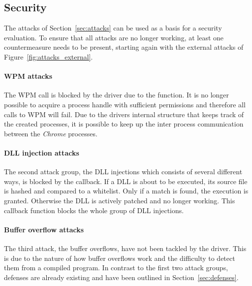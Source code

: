 \subsection{Security}
\label{sec:security}
The attacks of Section~\ref{sec:attacks} can be used as a basis for a security evaluation. To ensure that all attacks are no longer working, at least one countermeasure needs to be present, starting again with the external attacks of Figure~\ref{fig:attacks_external}. 

\paragraph{\gls{WPM} attacks}
The \gls{WPM} call is blocked by the driver due to the  function. It is no longer possible to acquire a process handle with sufficient permissions and therefore all calls to \gls{WPM} will fail. Due to the drivers internal structure that keeps track of the created processes, it is possible to keep up the inter process communication between the \emph{Chrome} processes. 

\paragraph{\gls{DLL} injection attacks}
The second attack group, the \gls{DLL} injections which consists of several different ways, is blocked by the  callback. If a \gls{DLL} is about to be executed, its source file is hashed and compared to a whitelist. Only if a match is found, the execution is granted. Otherwise the \gls{DLL} is actively patched and no longer working. This callback function blocks the whole group of \gls{DLL} injections.

\paragraph{Buffer overflow attacks}
The third attack, the buffer overflows, have not been tackled by the driver. This is due to the nature of how buffer overflows work and the difficulty to detect them from a compiled program. In contrast to the first two attack groups, defenses are already existing and have been outlined in Section~\ref{sec:defenses}.

